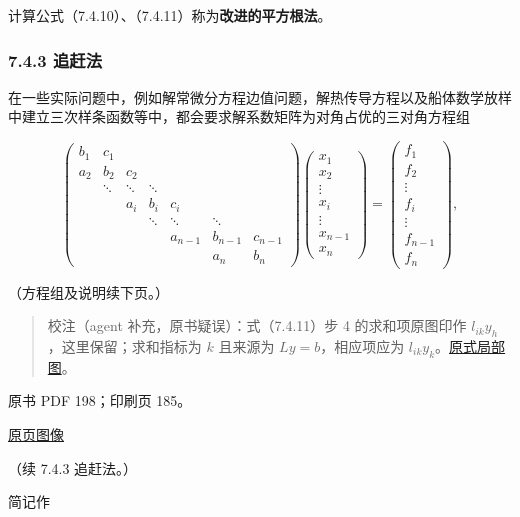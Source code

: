 \documentclass[
  10pt,
  fontset=fandol]{ctexart}
\begin{document}
计算公式（7.4.10）、（7.4.11）称为\textbf{改进的平方根法}。

\subsubsection{7.4.3 追赶法}\label{ux8ffdux8d76ux6cd5}

在一些实际问题中，例如解常微分方程边值问题，解热传导方程以及船体数学放样中建立三次样条函数等中，都会要求解系数矩阵为对角占优的三对角方程组

\[
\begin{pmatrix}
b_1&c_1&&&&&\\
a_2&b_2&c_2&&&&\\
&\ddots&\ddots&\ddots&&&\\
&&a_i&b_i&c_i&&\\
&&&\ddots&\ddots&\ddots&\\
&&&&a_{n-1}&b_{n-1}&c_{n-1}\\
&&&&&a_n&b_n
\end{pmatrix}
\begin{pmatrix}x_1\\x_2\\\vdots\\x_i\\\vdots\\x_{n-1}\\x_n\end{pmatrix}
=
\begin{pmatrix}f_1\\f_2\\\vdots\\f_i\\\vdots\\f_{n-1}\\f_n\end{pmatrix},
\]

（方程组及说明续下页。）

\begin{quote}
校注（agent 补充，原书疑误）：式（7.4.11）步 4 的求和项原图印作
\(l_{ik}y_h\)，这里保留；求和指标为 \(k\) 且来源为 \(Ly=b\)，相应项应为
\(l_{ik}y_k\)。\href{../../../staging/ch07b/assets/197-solves.png}{原式局部图}。
\end{quote}

\clearpage

原书 PDF 198；印刷页 185。

\href{../../../source-images/pdf-198.jpeg}{原页图像}

（续 7.4.3 追赶法。）

简记作
\end{document}
